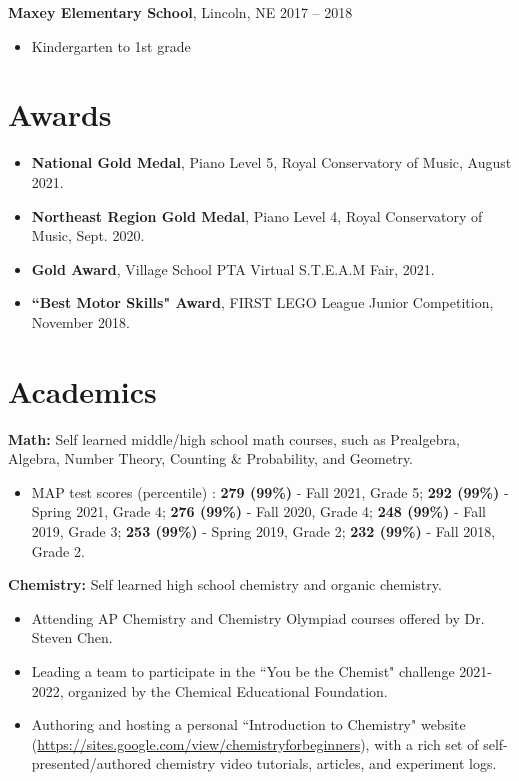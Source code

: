 \documentclass[line,margin]{res}
\begin{document}
\begin{resume}
  \vskip -0.05in
  {\bf Maxey Elementary School}, Lincoln, NE \hfill 2017 -- 2018
  \vskip 0.05in
  \begin{itemize}
    \item  Kindergarten to 1st grade
  \end{itemize}


  \section{Awards}
  \begin{itemize}[leftmargin=*]
    \item {\bf National Gold Medal}, Piano Level 5, Royal
      Conservatory of Music, August 2021.
    \item {\bf Northeast Region Gold Medal}, Piano Level 4, Royal
      Conservatory of Music, Sept. 2020.
    \item {\bf Gold Award}, Village School PTA Virtual S.T.E.A.M Fair, 2021.
    \item {\bf ``Best Motor Skills" Award}, FIRST LEGO League Junior
      Competition, November 2018.
  \end{itemize}

  \section{Academics}
  {\bf  Math:} Self learned middle/high school math courses, such as
  Prealgebra, Algebra, Number Theory, Counting \& Probability, and Geometry.
  \vskip 0.05in
  \begin{itemize}
    \item MAP test scores (percentile) : \textbf{279 (99\%)} - Fall
      2021, Grade 5; \textbf{292 (99\%)} - Spring 2021, Grade 4;
      \textbf{276 (99\%)} - Fall 2020, Grade 4; \textbf{248 (99\%)} -
      Fall 2019, Grade 3; \textbf{253 (99\%)} - Spring 2019, Grade 2;
      \textbf{232 (99\%)} - Fall 2018, Grade 2.
  \end{itemize}

  {\bf  Chemistry:} Self learned high school chemistry and organic chemistry.
  \vskip 0.05in
  \begin{itemize}
    \item Attending AP Chemistry and Chemistry Olympiad courses
      offered by Dr. Steven Chen.
    \item Leading a team to participate in the ``You be the Chemist"
      challenge 2021-2022, organized by the Chemical Educational Foundation.
    \item Authoring and hosting a personal ``Introduction to
      Chemistry" website
      (\url{https://sites.google.com/view/chemistryforbeginners}),
      with a rich set of self-presented/authored chemistry video
      tutorials, articles, and experiment logs.
  \end{itemize}


\end{resume}
\end{document}
